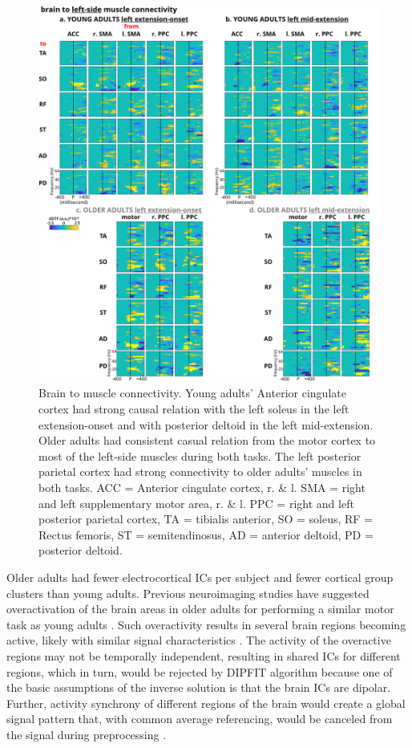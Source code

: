 \documentclass[../thesis_seyed.tex]{subfiles}
\begin{document}
\begin{figure}[H]

    \centering
    \includegraphics[scale=0.80]{../img/figure 5 - B2M connectivity.jpg}
    \caption{Brain to muscle connectivity. Young adults’ Anterior cingulate cortex had strong causal relation with the left soleus in the left extension-onset and with posterior deltoid in the left mid-extension. Older adults had consistent casual relation from the motor cortex to most of the left-side muscles during both tasks. The left posterior parietal cortex had strong connectivity to older adults’ muscles in both tasks. ACC = Anterior cingulate cortex, r. \& l. SMA = right and left supplementary motor area, r. \& l. PPC = right and left posterior parietal cortex, TA = tibialis anterior, SO = soleus, RF = Rectus femoris, ST = semitendinosus, AD = anterior deltoid, PD = posterior deltoid.}
    \label{fig:b2m}
\end{figure}

Older adults had fewer electrocortical ICs per subject and fewer cortical group clusters than young adults. Previous neuroimaging studies have suggested overactivation of the brain areas in older adults for performing a similar motor task as young adults \cite{Reuter-Lorenz2008-bn}. Such overactivity results in several brain regions becoming active, likely with similar signal characteristics \cite{Seidler2010-yv}. The activity of the overactive regions may not be temporally independent, resulting in shared ICs for different regions, which in turn, would be rejected by DIPFIT algorithm because one of the basic assumptions of the inverse solution is that the brain ICs are dipolar. Further, activity synchrony of different regions of the brain would create a global signal pattern that, with common average referencing, would be canceled from the signal during preprocessing \cite{Roeder2020-tv,Chella2016-zf}.
\end{document}
